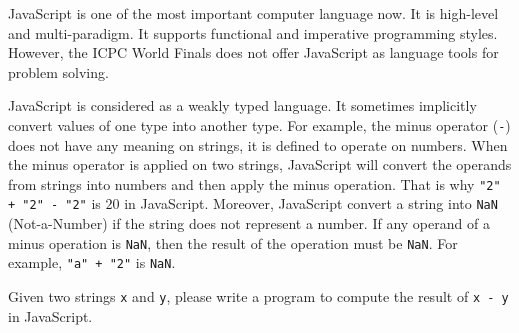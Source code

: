 JavaScript is one of the most important computer language now.
It is high-level and multi-paradigm.
It supports functional and imperative programming styles.
However, the ICPC World Finals does not offer JavaScript as language tools
for problem solving.

JavaScript is considered as a weakly typed language.
It sometimes implicitly convert values of one type into another type.
For example, the minus operator (\verb|-|) does not have any meaning on strings,
it is defined to operate on numbers. 
When the minus operator is applied on two strings, JavaScript will convert
the operands from strings into numbers and then apply the minus operation.
That is why \verb|"2" + "2" - "2"| is $20$ in JavaScript.
Moreover,
JavaScript convert a string into \verb+NaN+ 
(Not-a-Number) if the string does not represent a number. 
If any operand of a minus operation is \verb+NaN+, 
then the result of the operation must be \verb+NaN+.
For example, \verb|"a" + "2"| is \verb+NaN+.

Given two strings \verb+x+ and \verb+y+, 
please write a program to compute the result 
of \verb|x - y| in JavaScript.
